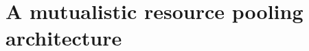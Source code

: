 \chapter{A mutualistic resource pooling architecture}
\label{chapter:preflex}

\renewcommand{\locfolder}{\chapfolder/preflex}




